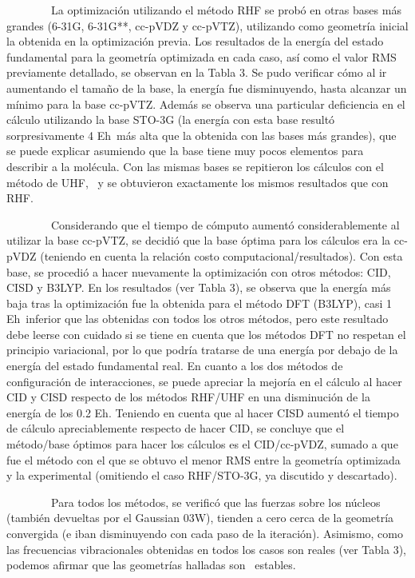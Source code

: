 \documentclass[]{article}
\begin{document}
{~~~~~~~~La optimización utilizando el método RHF se probó en otras
bases más grandes (6-31G, 6-31G**, cc-pVDZ y cc-pVTZ), utilizando como
geometría inicial la obtenida en la optimización previa. Los resultados
de la energía del estado fundamental para la geometría optimizada en
cada caso, así como el valor RMS previamente detallado, se observan en
la Tabla 3. Se pudo verificar cómo al ir aumentando el tamaño de la
base, la energía fue disminuyendo, hasta alcanzar un mínimo para la base
cc-pVTZ. Además se observa una particular deficiencia en el cálculo
utilizando la base STO-3G (la energía con esta base resultó
sorpresivamente 4 E}{h}{~más alta que la obtenida con las bases más
grandes), que se puede explicar asumiendo que la base tiene muy pocos
elementos para describir a la molécula. Con las mismas bases se
repitieron los cálculos con el método de UHF, ~y se obtuvieron
exactamente los mismos resultados que con RHF.}

{~~~~~~~~Considerando que el tiempo de cómputo aumentó considerablemente
al utilizar la base cc-pVTZ, se decidió que la base óptima para los
cálculos era la cc-pVDZ (teniendo en cuenta la relación costo
computacional/resultados). Con esta base, se procedió a hacer nuevamente
la optimización con otros métodos: CID, CISD y B3LYP. En los resultados
(ver Tabla 3), se observa que la energía más baja tras la optimización
fue la obtenida para el método DFT (B3LYP), casi 1 E}{h}{~inferior que
las obtenidas con todos los otros métodos, pero este resultado debe
leerse con cuidado si se tiene en cuenta que los métodos DFT no respetan
el principio variacional, por lo que podría tratarse de una energía por
debajo de la energía del estado fundamental real. En cuanto a los dos
métodos de configuración de interacciones, se puede apreciar la mejoría
en el cálculo al hacer CID y CISD respecto de los métodos RHF/UHF en una
disminución de la energía de los 0.2 E}{h}{. Teniendo en cuenta que al
hacer CISD aumentó el tiempo de cálculo apreciablemente respecto de
hacer CID, se concluye que el método/base óptimos para hacer los
cálculos es el CID/cc-pVDZ, sumado a que fue el método con el que se
obtuvo el menor RMS entre la geometría optimizada y la experimental
(omitiendo el caso RHF/STO-3G, ya discutido y descartado).}

{~~~~~~~~Para todos los métodos, se verificó que las fuerzas sobre los
núcleos (también devueltas por el }{Gaussian 03W}{), tienden a cero
cerca de la geometría convergida (e iban disminuyendo con cada paso de
la iteración). Asimismo, como las frecuencias vibracionales obtenidas en
todos los casos son reales (ver Tabla 3), podemos afirmar que las
geometrías halladas son ~estables.}
\end{document}
